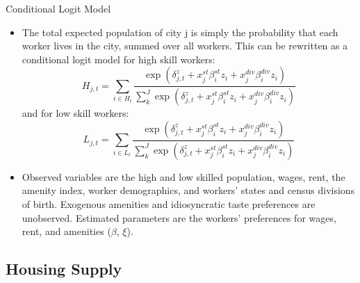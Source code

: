 \documentclass[aspectratio=169]{beamer}
\begin{document}
\begin{frame}{Conditional Logit Model}

\begin{itemize}
    \item<1-> The total expected population of city j is simply the probability that each worker lives in the city, summed over all workers.  This can be rewritten as a conditional logit model for high skill workers:
    \begin{equation*}
        H_{j,t} = \sum_{i \in H_{t}} \frac{\exp\left( \delta_{j,t}^{z} + x_{j}^{st}\beta_{i}^{st} z_{i} + x_{j}^{div} \beta_{i}^{div} z_{i} \right)}{\sum_{k}^{J} \exp\left( \delta_{j,t}^{z} + x_{j}^{st}\beta_{i}^{st} z_{i} + x_{j}^{div} \beta_{i}^{div} z_{i} \right)}
    \end{equation*}
    and for low skill workers:
    \begin{equation*}
        L_{j,t} = \sum_{i \in L_{t}} \frac{\exp\left( \delta_{j,t}^{z} + x_{j}^{st}\beta_{i}^{st} z_{i} + x_{j}^{div} \beta_{i}^{div} z_{i} \right)}{\sum_{k}^{J} \exp\left( \delta_{j,t}^{z} + x_{j}^{st}\beta_{i}^{st} z_{i} + x_{j}^{div} \beta_{i}^{div} z_{i} \right)}
    \end{equation*}
    \item<2->Observed variables are the high and low skilled population, wages, rent, the amenity index, worker demographics, and workers’ states and census divisions of birth.  Exogenous amenities and idiosyncratic taste preferences are unobserved.  Estimated parameters are the workers’ preferences for wages, rent, and amenities ($ \beta $, $ \xi $).
\end{itemize}
    
\end{frame}


\subsection{Housing Supply}

\end{document}
